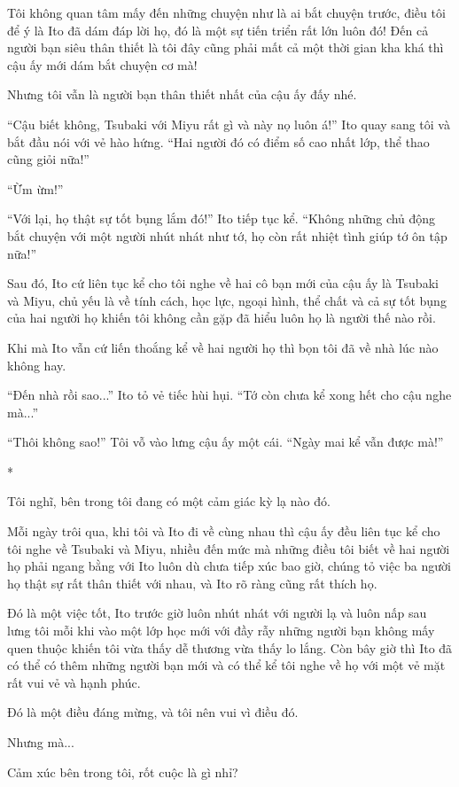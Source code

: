 {Tôi không quan tâm mấy đến những chuyện như là ai bắt chuyện trước, điều
tôi để ý là Ito đã dám đáp lời họ, đó là một sự tiến triển rất lớn luôn
đó! Đến cả người bạn siêu thân thiết là tôi đây cũng phải mất cả một
thời gian kha khá thì cậu ấy mới dám bắt chuyện cơ mà!

Nhưng tôi vẫn là người bạn thân thiết nhất của cậu ấy đấy nhé.

``Cậu biết không, Tsubaki với Miyu rất gì và này nọ luôn á!'' Ito quay
sang tôi và bắt đầu nói với vẻ hào hứng. ``Hai người đó có điểm số cao
nhất lớp, thể thao cũng giỏi nữa!''

``Ừm ừm!''

``Với lại, họ thật sự tốt bụng lắm đó!'' Ito tiếp tục kể. ``Không những
chủ động bắt chuyện với một người nhút nhát như tớ, họ còn rất nhiệt
tình giúp tớ ôn tập nữa!''

Sau đó, Ito cứ liên tục kể cho tôi nghe về hai cô bạn mới của cậu ấy là
Tsubaki và Miyu, chủ yếu là về tính cách, học lực, ngoại hình, thể chất
và cả sự tốt bụng của hai người họ khiến tôi không cần gặp đã hiểu luôn
họ là người thế nào rồi.

Khi mà Ito vẫn cứ liến thoắng kể về hai người họ thì bọn tôi đã về nhà
lúc nào không hay.

``Đến nhà rồi sao...'' Ito tỏ vẻ tiếc hùi hụi. ``Tớ còn chưa kể xong hết
cho cậu nghe mà...''

``Thôi không sao!'' Tôi vỗ vào lưng cậu ấy một cái. ``Ngày mai kể vẫn
được mà!''

*

Tôi nghĩ, bên trong tôi đang có một cảm giác kỳ lạ nào đó.

Mỗi ngày trôi qua, khi tôi và Ito đi về cùng nhau thì cậu ấy đều liên
tục kể cho tôi nghe về Tsubaki và Miyu, nhiều đến mức mà những điều tôi
biết về hai người họ phải ngang bằng với Ito luôn dù chưa tiếp xúc bao
giờ, chúng tỏ việc ba người họ thật sự rất thân thiết với nhau, và Ito
rõ ràng cũng rất thích họ.

Đó là một việc tốt, Ito trước giờ luôn nhút nhát với người lạ và luôn
nấp sau lưng tôi mỗi khi vào một lớp học mới với đầy rẫy những người bạn
không mấy quen thuộc khiến tôi vừa thấy dễ thương vừa thấy lo lắng. Còn
bây giờ thì Ito đã có thể có thêm những người bạn mới và có thể kể tôi
nghe về họ với một vẻ mặt rất vui vẻ và hạnh phúc.

Đó là một điều đáng mừng, và tôi nên vui vì điều đó.

Nhưng mà...

Cảm xúc bên trong tôi, rốt cuộc là gì nhỉ?

}
